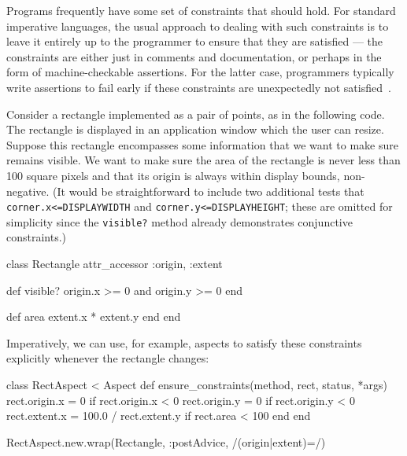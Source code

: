 
Programs frequently have some set of constraints that should hold.
For standard imperative languages, the usual approach to dealing with
such constraints is to leave it entirely up to the programmer to
ensure that they are satisfied --- the constraints are either just in
comments and documentation, or perhaps in the form of
machine-checkable assertions.  For the latter case, programmers
typically write assertions to fail early if these constraints are
unexpectedly not satisfied~\cite{rinard2005exploring}.

Consider a rectangle implemented as a pair of points, as in the
following code.  The rectangle is displayed in an application window
which the user can resize.  Suppose this rectangle encompasses some
information that we want to make sure remains visible. We want to make
sure the area of the rectangle is never less than 100 square pixels
and that its origin is always within display bounds,
\ie non-negative.  (It would be straightforward to include two
additional tests that \lstinline{corner.x<=DISPLAYWIDTH} and
\lstinline{corner.y<=DISPLAYHEIGHT}; these are omitted for simplicity
since the \lstinline{visible?} method already demonstrates conjunctive
constraints.)

\begin{code}
class Rectangle
  attr_accessor :origin, :extent

  def visible?
    origin.x >= 0 and origin.y >= 0
  end

  def area
    extent.x * extent.y
  end
end
\end{code}


Imperatively, we can use, for example, aspects to satisfy these
constraints explicitly whenever the rectangle changes:
\begin{code}
class RectAspect < Aspect
  def ensure_constraints(method, rect, status, *args)
    rect.origin.x = 0 if rect.origin.x < 0
    rect.origin.y = 0 if rect.origin.y < 0
    rect.extent.x = 100.0 / rect.extent.y if rect.area < 100
  end
end

RectAspect.new.wrap(Rectangle, :postAdvice, /(origin|extent)=/)
\end{code}

